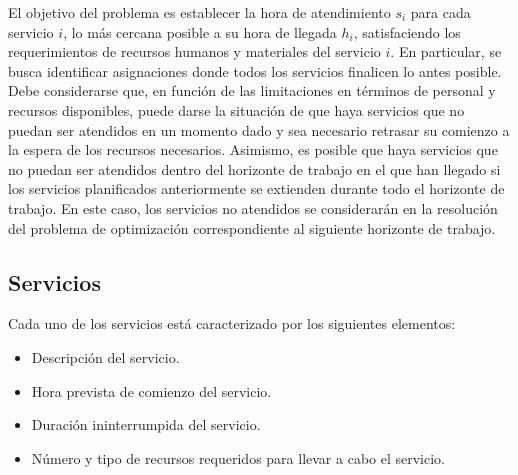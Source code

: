 El objetivo del problema es establecer la hora de atendimiento $s_i$ para cada servicio $i$, lo más cercana posible a su hora de llegada $h_i$, satisfaciendo los requerimientos de recursos humanos y materiales del servicio $i$. En particular, se busca identificar asignaciones donde todos los servicios finalicen lo antes posible. Debe considerarse que, en función de las limitaciones en términos de personal y recursos disponibles, puede darse la situación de que haya servicios que no puedan ser atendidos en un momento dado y sea necesario retrasar su comienzo a la espera de los recursos necesarios. Asimismo, es posible que haya servicios que no puedan ser atendidos dentro del horizonte de trabajo en el que han llegado si los servicios planificados anteriormente se extienden durante todo el horizonte de trabajo. En este caso, los servicios no atendidos se considerarán en la resolución del problema de optimización correspondiente al siguiente horizonte de trabajo.

\subsection{Servicios}

Cada uno de los servicios está caracterizado por los siguientes elementos:

\begin{itemize}
    \item Descripción del servicio.
    \item Hora prevista de comienzo del servicio.
    \item Duración ininterrumpida del servicio.
    \item Número y tipo de recursos requeridos para llevar a cabo el servicio. 
\end{itemize}





